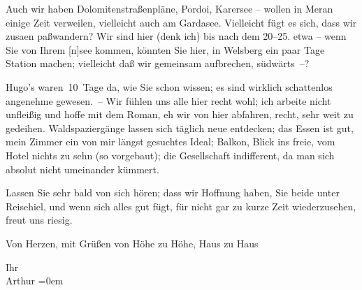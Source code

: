\pstart
           Auch wir haben Dolomitenstraßenpläne, Pordoi, Karersee – wollen in Meran einige Zeit
               verweilen, vielleicht auch am Gardasee.
               Vielleicht fügt es sich, dass wir zusa{\geminationm}en paßwandern?
               Wir sind hier (denk ich) bis nach dem 20–25. etwa – wenn
               Sie von Ihrem {[}n{]}see
               kommen, könnten Sie hier, in Welsberg ein paar
               Tage {\pb}Station machen; vielleicht daß wir gemeinsam
               aufbrechen, südwärts –?\pend
           
\pstart
           Hugo’s waren 10 Tage da, wie Sie
               schon wissen; es sind wirklich schattenlos angenehme gewesen. – Wir fühlen uns alle
               hier recht wohl; ich arbeite nicht unfleißig und hoffe mit dem Roman, eh wir von hier abfahren, recht,
               sehr weit zu gedeihen. Waldspaziergänge lassen sich täglich neue entdecken; das Essen
               ist gut, mein Zimmer ein von mir längst gesuchtes Ideal; Balkon, Blick ins freie, vom
               Hotel nichts zu sehn (so vorgebaut); die Gesellschaft indifferent, da man sich
               absolut nicht umeinander kümmert.\pend
           
\pstart
           Lassen Sie sehr bald von sich hören; dass wir Hoffnung haben, Sie beide unter
                  Reisehi{\geminationm}el, und wenn sich alles gut fügt, für nicht
               gar zu kurze Zeit wiederzusehen, freut uns riesig.\pend
           
\pstart
           Von Herzen, mit Grüßen von Höhe zu Höhe, Haus zu Haus\pend
           
\pstart
           Ihr{\\[\baselineskip]}\spacefill\mbox{Arthur}\pend
           \leftskip=0em{}\endnumbering{}  
      